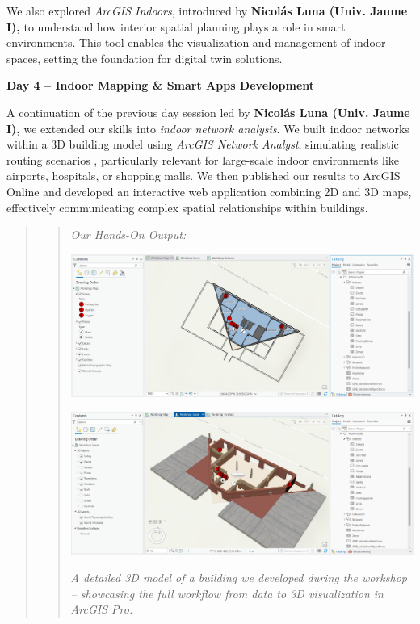 \documentclass[
  letterpaper,
  DIV=11,
  numbers=noendperiod]{scrartcl}
\begin{document}
We also explored \emph{ArcGIS Indoors}, introduced by \textbf{Nicolás
Luna (Univ. Jaume I),} to understand how interior spatial planning plays
a role in smart environments. This tool enables the visualization and
management of indoor spaces, setting the foundation for digital twin
solutions.

\textbf{Day 4 -- Indoor Mapping \& Smart Apps Development}

A continuation of the previous day session led by \textbf{Nicolás Luna
(Univ. Jaume I),} we extended our skills into \emph{indoor network
analysis}. We built indoor networks within a 3D building model using
\emph{ArcGIS Network Analyst}, simulating realistic routing scenarios ,
particularly relevant for large-scale indoor environments like airports,
hospitals, or shopping malls. We then published our results to ArcGIS
Online and developed an interactive web application combining 2D and 3D
maps, effectively communicating complex spatial relationships within
buildings.

\begin{quote}
\begin{quote}
\emph{Our Hands-On Output:}

\hfill\break
\includegraphics[width=7.95833in,height=\textheight]{images/indoor mapping.png}

\includegraphics[width=7.97917in,height=\textheight]{images/3D result.png}

\emph{A detailed 3D model of a building we developed during the workshop
-- showcasing the full workflow from data to 3D visualization in ArcGIS
Pro.}
\end{quote}
\end{quote}
\end{document}
